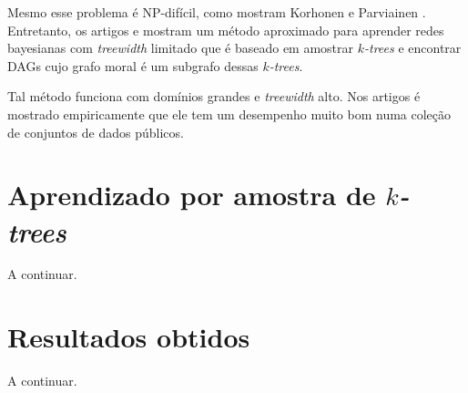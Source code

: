 Mesmo esse problema é NP-difícil, como mostram Korhonen e Parviainen \cite{korhonen}. Entretanto, os artigos \cite{nie} e \cite{maua} mostram um método aproximado para aprender redes bayesianas com \emph{treewidth} limitado que é baseado em amostrar \emph{$k$-trees} e encontrar DAGs cujo grafo moral é um subgrafo dessas \emph{$k$-trees}.

Tal método funciona com domínios grandes e \emph{treewidth} alto. Nos artigos é mostrado empiricamente que ele tem um desempenho muito bom numa coleção de conjuntos de dados públicos.

\section{Aprendizado por amostra de \emph{$k$-trees}}

A continuar. %

\section{Resultados obtidos}

A continuar. %
